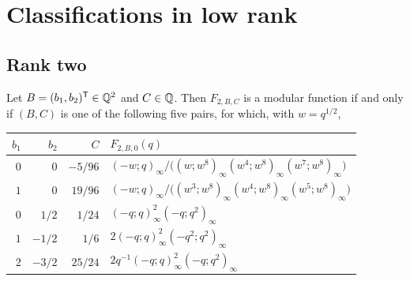 \section{Classifications in low rank}\label{sec:low}

\subsection{Rank two}

\begin{theorem}\label{thm:r2}
Let $B=(b_1,b_2)^{\mathsf{T}}\in\mathbb{Q}^2$ and $C\in\mathbb{Q}$. Then $F_{2,B,C}$ is a modular function if and only if $(B,C)$ is one of the following five pairs, for which, with $w=q^{1/2}$,
\begin{center}
\begin{tabular}{rrrl}
\toprule
$b_1$ & $b_2$ & $C$ & $F_{2,B,0}(q)$\\
\midrule
$0$ & $0$ & $-5/96$ & $(-w;q)_\infty\big/\bigl((w;w^8)_\infty(w^4;w^8)_\infty(w^7;w^8)_\infty\bigr)$\\
$1$ & $0$ & $19/96$ & $(-w;q)_\infty\big/\bigl((w^3;w^8)_\infty(w^4;w^8)_\infty(w^5;w^8)_\infty\bigr)$\\
$0$ & $1/2$ & $1/24$ & $(-q;q)_\infty^2(-q;q^2)_\infty$\\
$1$ & $-1/2$ & $1/6$ & $2(-q;q)_\infty^2(-q^2;q^2)_\infty$\\
$2$ & $-3/2$ & $25/24$ & $2q^{-1}(-q;q)_\infty^2(-q;q^2)_\infty$\\
\bottomrule
\end{tabular}
\end{center}
\end{theorem}


